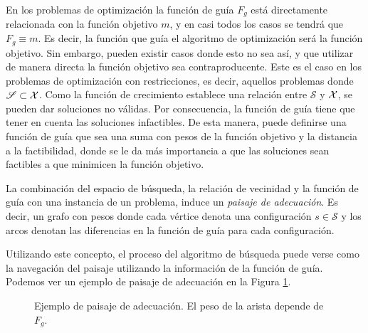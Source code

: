 En los problemas de optimización la función de guía $F_g$ está directamente relacionada con la función objetivo $m$, y en casi todos los casos se tendrá que $F_g\equiv m$. Es decir, la función que guía el algoritmo de optimización será la función objetivo. Sin embargo, pueden existir casos donde esto no sea así, y que utilizar de manera directa la función objetivo sea contraproducente. Este es el caso en los problemas de optimización con restricciones, es decir, aquellos problemas donde $\mathscr{S} \subset \mathcal{X}$. Como la función de crecimiento establece una relación entre $\mathcal{S}$ y $\mathcal{X}$, se pueden dar soluciones no válidas. Por consecuencia, la función de guía tiene que tener en cuenta las soluciones infactibles. De esta manera, puede definirse una función de guía que sea una suma con pesos de la función objetivo y la distancia a la factibilidad, donde se le da más importancia a que las soluciones sean factibles a que minimicen la función objetivo.

\begin{definition}
    La combinación del espacio de búsqueda, la relación de vecinidad y la función de guía con una instancia de un problema, induce un \textit{paisaje de adecuación}. Es decir, un grafo con pesos donde cada vértice denota una configuración $s\in\mathcal{S}$ y los arcos denotan las diferencias en la función de guía para cada configuración.
\end{definition}
Utilizando este concepto, el proceso del algoritmo de búsqueda puede verse como la navegación del paisaje utilizando la información de la función de guía. Podemos ver un ejemplo de paisaje de adecuación en la Figura \ref{fig:fit-lands}.
\begin{figure}[ht]
    \hspace{5.5cm}
    \caption{Ejemplo de paisaje de adecuación. El peso de la arista depende de $F_g$.}
    \label{fig:fit-lands}
\end{figure}

